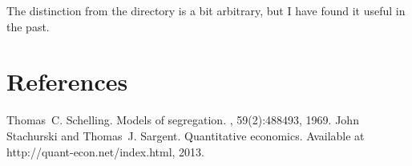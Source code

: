 \documentclass[a4paper,11pt,english]{sphinxmanual}
\begin{document}
The distinction from the  directory is a bit arbitrary, but I have found it useful in the past.


\chapter{References}
\label{\detokenize{references:references}}\label{\detokenize{references:id1}}\label{\detokenize{references::doc}}


\begin{sphinxthebibliography}{1}
Thomas C. Schelling. Models of segregation. , 59(2):488\textendash{}493, 1969.
John Stachurski and Thomas J. Sargent. Quantitative economics. Available at http://quant-econ.net/index.html, 2013.
\end{sphinxthebibliography}


\renewcommand{\indexname}{Python Module Index}
\begin{sphinxtheindex}
\let\bigletter\sphinxstyleindexlettergroup
\bigletter{a}
\item\relax{}
\indexspace
\bigletter{b}
\item\relax{}
\indexspace
\bigletter{d}
\item\relax{}
\end{sphinxtheindex}

\renewcommand{\indexname}{Index}
\printindex
\end{document}
